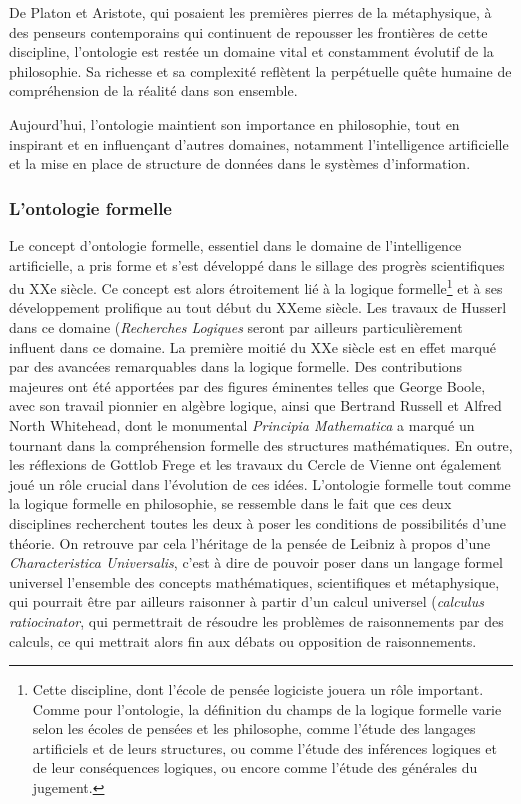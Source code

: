 \documentclass[12pt]{report}
\begin{document}
De Platon et Aristote, qui posaient les premières pierres de la métaphysique, à des penseurs contemporains qui continuent de repousser les frontières de cette discipline, l'ontologie est restée un domaine vital et constamment évolutif de la philosophie. Sa richesse et sa complexité reflètent la perpétuelle quête humaine de compréhension de la réalité dans son ensemble.

Aujourd'hui, l'ontologie maintient son importance en philosophie, tout en inspirant et en influençant d'autres domaines, notamment l'intelligence artificielle et la mise en place de structure de données dans le systèmes d'information.
 
\subsubsection{L'ontologie formelle}
Le concept d'ontologie formelle, essentiel dans le domaine de l'intelligence artificielle, a pris forme et s'est développé dans le sillage des progrès scientifiques du XXe siècle. Ce concept est alors étroitement lié à la logique formelle\footnote{Cette discipline, dont l'école de pensée logiciste jouera un rôle important. Comme pour l'ontologie, la définition du champs de la logique formelle varie selon les écoles de pensées et les philosophe, comme l'étude des langages artificiels et de leurs structures, ou comme l'étude des inférences logiques et de leur conséquences logiques, ou encore comme l'étude des générales du jugement.} et à ses développement prolifique au tout début du XXeme siècle. Les travaux de Husserl dans ce domaine (\textit{Recherches Logiques} seront par ailleurs particulièrement influent dans ce domaine. La première moitié du XXe siècle est en effet marqué par des avancées remarquables dans la logique formelle. Des contributions majeures ont été apportées par des figures éminentes telles que George Boole, avec son travail pionnier en algèbre logique, ainsi que Bertrand Russell et Alfred North Whitehead, dont le monumental \textit{Principia Mathematica} a marqué un tournant dans la compréhension formelle des structures mathématiques. En outre, les réflexions de Gottlob Frege et les travaux du Cercle de Vienne ont également joué un rôle crucial dans l'évolution de ces idées. L'ontologie formelle tout comme la logique formelle en philosophie, se ressemble dans le fait que ces deux disciplines recherchent toutes les deux à poser les conditions de possibilités d'une théorie. On retrouve par cela l'héritage de la pensée de Leibniz à propos d'une \textit{Characteristica Universalis}, c'est à dire de pouvoir poser dans un langage formel universel l'ensemble des concepts mathématiques, scientifiques et métaphysique, qui pourrait être par ailleurs raisonner à partir d'un calcul universel (\textit{calculus ratiocinator}, qui permettrait de résoudre les problèmes de raisonnements par des calculs, ce qui mettrait alors fin aux débats ou opposition de raisonnements. 
\end{document}
